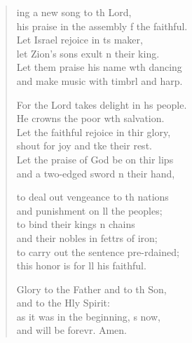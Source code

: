 \settowidth{\versewidth}{his praise in the assembly of the faithful.}
\begin{verse}%
  \begin{patverse}
    ing a new song to th Lord,\Med\\
his praise in the assembly f the faithful.\\
Let Israel rejoice in \pointup{\i}ts maker,\Med\\
let Zion’s sons exult n their king.\\
Let them praise his name w\pointup{\i}th dancing\Med\\
and make music with timbrl and harp.

For the Lord takes delight in h\pointup{\i}s people.\Med\\
He crowns the poor wth salvation.\\
Let the faithful rejoice in thir glory,\Med\\
shout for joy and tke their rest.\\
Let the praise of God be on thir lips\Med\\
and a two-edged sword n their hand,

to deal out vengeance to th nations\Med\\
and punishment on ll the peoples;\\
to bind their kings \pointup{\i}n chains\Med\\
and their nobles in fettrs of iron;\\
to carry out the sentence pre-rdained;\Med\\
this honor is for ll his faithful.

Glory to the Father and to th Son,\Med\\
and to the Hly Spirit:\\
as it was in the beginning, \pointup{\i}s now,\Med\\
and will be forevr. Amen.
  \end{patverse}
\end{verse}
